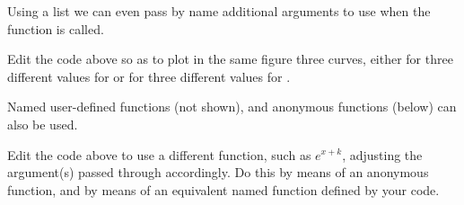\documentclass[krantz2]{krantz}\usepackage{knitr}%
\begin{document}
Using a list we can even pass by name additional arguments to use when the function is called.

\begin{knitrout}\footnotesize
{}\color{fgcolor}\begin{kframe}
\begin{alltt}
\hlstd{(}\hlstd{(} \hlstd{=} \hlopt{-}\hlopt{:}\hlstd{),} \hlstd{(}  \hlopt{+}
  \hlstd{(}   \hlstd{=} \hlstd{(} \hlstd{=} \hlstd{,}  \hlstd{=} \hlstd{))}
\end{alltt}
\end{kframe}
\end{knitrout}

\begin{playground}
Edit the code above so as to plot in the same figure three curves, either for three different values for  or for three different values for .
\end{playground}

Named user-defined functions (not shown), and anonymous functions (below) can also be used.

\begin{knitrout}\footnotesize
{}\color{fgcolor}\begin{kframe}
\begin{alltt}
\hlstd{(}\hlstd{(} \hlstd{=} \hlopt{:}\hlstd{),} \hlstd{(}  \hlopt{+}
  \hlstd{(} \hlstd{=} \hlstd{(}\hlstd{,} \hlstd{,}  \hlopt{+}  \hlopt{*} \hlopt{^}\hlstd{\},}
                 \hlstd{=} \hlstd{(} \hlstd{=} \hlstd{,}  \hlstd{=} \hlstd{))}
\end{alltt}
\end{kframe}
\end{knitrout}

\begin{playground}
Edit the code above to use a different function, such as $e^{x + k}$, adjusting the argument(s) passed through  accordingly. Do this by means of an anonymous function, and by means of an equivalent named function defined by your code.
\end{playground}
\end{document}
